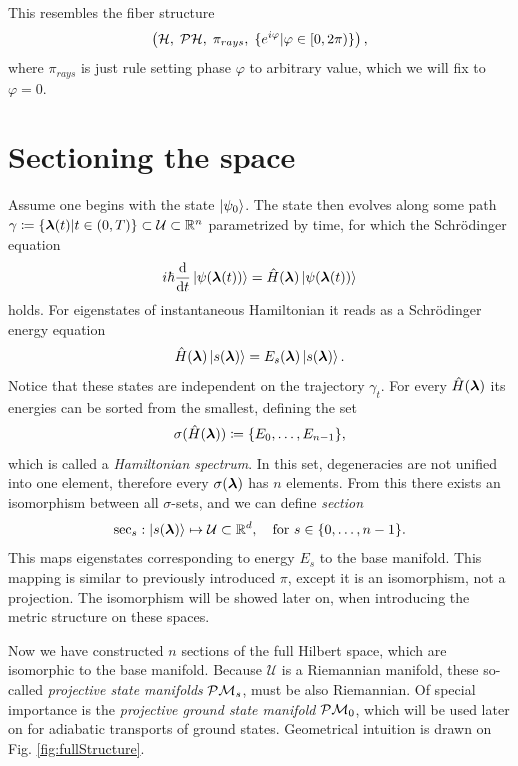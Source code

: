 This resembles the fiber structure
$$\left(\mathcal{H},\;\mathcal{P}\mathcal{H},\;\pi_{rays},\;\{e^{i\varphi}| \varphi\in[0,2\pi)\}\right),$$
where $\pi_{rays}$ is just rule setting phase $\varphi$ to arbitrary value, which we will fix to $\varphi=0$.







\section{Sectioning the space}
Assume one begins with the state $\ket{\psi_0}$. The state then evolves along some path $\gamma\coloneqq\{{\bm\lambda}(t)|t\in(0,T)\}\subset \mathcal U \subset \mathbb{R}^n$ parametrized by time, for which the Schr\"odinger equation
\begin{equation}
    i\hbar \frac{\mathrm{d} }{\mathrm{d} t}\ket{\psi({\bm\lambda}(t))} = \hat{H}({\bm\lambda})\ket{\psi({\bm\lambda}(t))}
    \label{eq:schrodinger}
\end{equation}
holds. For eigenstates of instantaneous Hamiltonian it reads as a Schr\"odinger energy equation
\begin{equation}
    \hat{H}({\bm\lambda})\ket{s({\bm\lambda})}=E_s({\bm\lambda})\ket{s({\bm\lambda})}.
    \label{eq:energySchrodinger}
\end{equation}
Notice that these states are independent on the trajectory $\gamma_t$.
For every $\hat{H}({\bm\lambda})$ its energies can be sorted from the smallest, defining the set 
\begin{equation}
    \sigma(\hat{H}({\bm\lambda}))\coloneqq\{E_0,\dots,E_{n-1}\},
\end{equation}
which is called a \emph{Hamiltonian spectrum}. In this set, degeneracies are not unified into one element, therefore every $\sigma({\bm\lambda})$ has $n$ elements. From this there exists an isomorphism between all $\sigma$-sets, and we can define \emph{section} 
$$\mathrm{sec}_s: \ket{s({\bm\lambda})}\mapsto \mathcal{U}\subset \mathbb{R}^d, \quad \text{for } s\in\{0,\dots, n-1\}.$$
This maps eigenstates corresponding to energy $E_s$ to the base manifold. This mapping is similar to previously introduced $\pi$, except it is an isomorphism, not a projection. The isomorphism will be showed later on, when introducing the metric structure on these spaces.

Now we have constructed $n$ sections of the full Hilbert space, which are isomorphic to the base manifold. Because $\mathcal U$ is a Riemannian manifold, these so-called \emph{projective state manifolds} $\mathcal{P}\mathcal{M}_s$, must be also Riemannian.
Of special importance is the \emph{projective ground state manifold} $\mathcal{P}\mathcal{M}_0$, which will be used later on for adiabatic transports of ground states. Geometrical intuition is drawn on Fig. \ref{fig:fullStructure}. 

